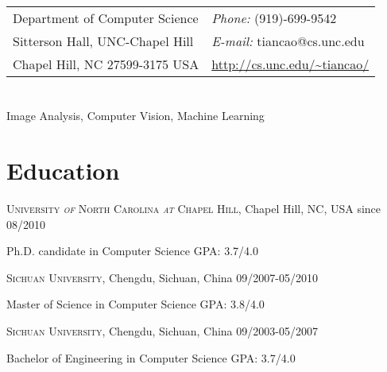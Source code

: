 \documentclass[line,margin]{res}
\newenvironment{list1}{
  \begin{list}{\ding{113}}{%
      \setlength{\itemsep}{0in}
      \setlength{\parsep}{0in} \setlength{\parskip}{0in}
      \setlength{\topsep}{0in} \setlength{\partopsep}{0in} 
      \setlength{\leftmargin}{0.17in}}}{\end{list}}
\begin{document}

\begin{resume}
\section{}
\vspace{.05in}
\begin{tabular}{@{}p{3in}p{3in}}
Department of Computer Science & {\it Phone:}  (919)-699-9542 \\            
Sitterson Hall, UNC-Chapel Hill & {\it E-mail:}  tiancao@cs.unc.edu \\
Chapel Hill, NC 27599-3175 USA&  \url{http://cs.unc.edu/~tiancao/} \\
\end{tabular}
 
\section{}       
\smallskip

Image Analysis, Computer Vision, Machine Learning

\section{\sc Education}
\smallskip

\textsc{University \textit{of} North Carolina \textit{at} Chapel Hill}, Chapel Hill, NC, USA \hfill{since 08/2010}\\
\vspace*{-.1in}
\begin{list1}
\item[] Ph.D. candidate in Computer Science \hfill{GPA: 3.7/4.0}
\end{list1}
 \vspace*{-.1in}
\textsc{Sichuan University}, Chengdu, Sichuan, China \hfill {09/2007-05/2010}\\
\vspace*{-.1in}
\begin{list1}
\item[] Master of Science in Computer Science  \hfill {GPA: 3.8/4.0}
\end{list1}
 \vspace*{-.1in}
\textsc{Sichuan University}, Chengdu, Sichuan, China \hfill{09/2003-05/2007}\\
 \vspace*{-.1in}
\begin{list1}
 \item[]  Bachelor of Engineering in Computer Science \hfill {GPA: 3.7/4.0}
\end{list1}


\end{resume}
\end{document}
